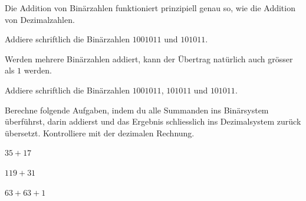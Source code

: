 \documentclass[%
11pt,%
twoside,%
titlepage,%
german,%
]{scrartcl}
\begin{document}
Die Addition von Bin\"arzahlen funktioniert prinzipiell genau so, wie die Addition von Dezimalzahlen.
\begin{ueb}
Addiere schriftlich die Bin\"arzahlen $1001011$ und $101011$.
\end{ueb}
\noindent Werden mehrere Bin\"arzahlen addiert, kann der \"Ubertrag nat\"urlich auch gr\"osser als $1$ werden.
\begin{ueb}
Addiere schriftlich die Bin\"arzahlen $1001011$, $101011$ und $101011$.
\end{ueb}
\begin{ueb}
Berechne folgende Aufgaben, indem du alle Summanden ins Bin\"arsystem \"uberf\"uhrst, darin addierst und das Ergebnis schliesslich ins Dezimalsystem zur\"uck \"uber\-setzt. Kontrolliere mit der dezimalen Rechnung.
\begin{enumeratea}
\item $35+17$
\item $119+31$
\item $63+63+1$
\end{enumeratea}
\end{ueb}



\cleardoublepage
\listoffigures
%
%
\end{document}
